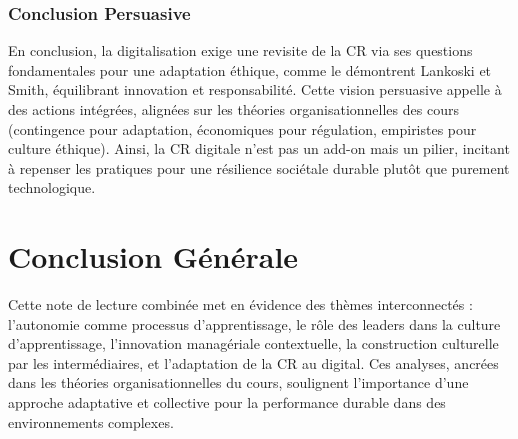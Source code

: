 \documentclass{rapportECL}
\begin{document}
\subsubsection{Conclusion Persuasive}
En conclusion, la digitalisation exige une revisite de la CR via ses questions fondamentales pour une adaptation éthique, comme le démontrent Lankoski et Smith, équilibrant innovation et responsabilité. Cette vision persuasive appelle à des actions intégrées, alignées sur les théories organisationnelles des cours (contingence pour adaptation, économiques pour régulation, empiristes pour culture éthique). Ainsi, la CR digitale n'est pas un add-on mais un pilier, incitant à repenser les pratiques pour une résilience sociétale durable plutôt que purement technologique.

\section{Conclusion Générale}
Cette note de lecture combinée met en évidence des thèmes interconnectés : l'autonomie comme processus d'apprentissage, le rôle des leaders dans la culture d'apprentissage, l'innovation managériale contextuelle, la construction culturelle par les intermédiaires, et l'adaptation de la CR au digital. Ces analyses, ancrées dans les théories organisationnelles du cours, soulignent l'importance d'une approche adaptative et collective pour la performance durable dans des environnements complexes.
\end{document}
